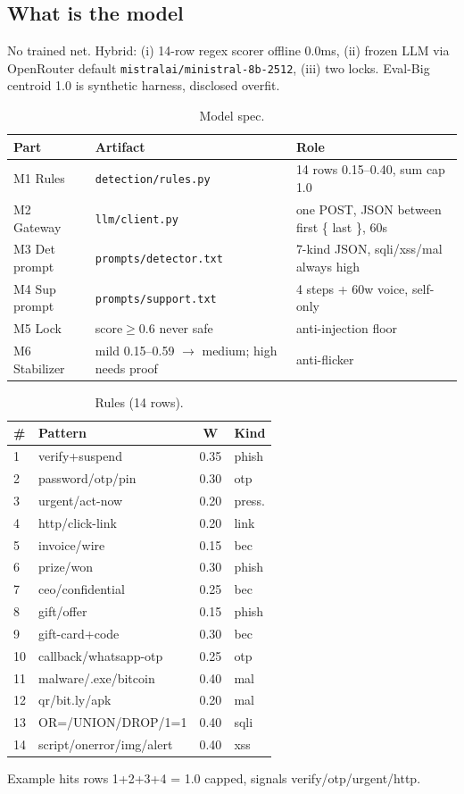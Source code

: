\documentclass[11pt,a4paper]{article}
\begin{document}
\subsection{What is the model}
No trained net. Hybrid: (i) 14-row regex scorer offline 0.0ms, (ii) frozen LLM via OpenRouter default \texttt{mistralai/ministral-8b-2512}, (iii) two locks. Eval-Big centroid 1.0 is synthetic harness, disclosed overfit.
\begin{table}[h]\centering\caption{Model spec.}\begin{tabular}{@{}llp{7cm}@{}} \toprule Part & Artifact & Role\\\midrule M1 Rules & \texttt{detection/rules.py} & 14 rows 0.15--0.40, sum cap 1.0\\
M2 Gateway & \texttt{llm/client.py} & one POST, JSON between first \{ last \}, 60s\\
M3 Det prompt & \texttt{prompts/detector.txt} & 7-kind JSON, sqli/xss/mal always high\\
M4 Sup prompt & \texttt{prompts/support.txt} & 4 steps + 60w voice, self-only\\
M5 Lock & score$\ge$0.6 never safe & anti-injection floor \cite{Hasan25,StruQ24}\\
M6 Stabilizer & mild 0.15--0.59 $\rightarrow$ medium; high needs proof & anti-flicker\\\bottomrule\end{tabular}\end{table}
\begin{table}[h]\centering\caption{Rules (14 rows).}\begin{tabular}{@{}llcl@{}}\toprule \# & Pattern & W & Kind\\\midrule 1 & verify+suspend & 0.35 & phish\\ 2 & password/otp/pin & 0.30 & otp\\ 3 & urgent/act-now & 0.20 & press.\\ 4 & http/click-link & 0.20 & link\\ 5 & invoice/wire & 0.15 & bec\\ 6 & prize/won & 0.30 & phish\\ 7 & ceo/confidential & 0.25 & bec\\ 8 & gift/offer & 0.15 & phish\\ 9 & gift-card+code & 0.30 & bec\\ 10 & callback/whatsapp-otp & 0.25 & otp\\ 11 & malware/.exe/bitcoin & 0.40 & mal\\ 12 & qr/bit.ly/apk & 0.20 & mal\\ 13 & OR=/UNION/DROP/1=1 & 0.40 & sqli\\ 14 & script/onerror/img/alert & 0.40 & xss\\\bottomrule\end{tabular}\end{table}
Example hits rows 1+2+3+4 = 1.0 capped, signals verify/otp/urgent/http.
\end{document}
